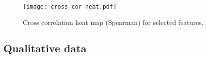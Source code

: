 \documentclass{sig-alternate}
\begin{document}
%
% 
%
%    
%
%
%



\begin{figure}
  \begin{center}
    \texttt{[image: cross-cor-heat.pdf]}
  \end{center}
  \caption{Cross correlation heat map (Spearman) for selected features.}
  \label{fig:crosscor}
\end{figure}

\subsection{Qualitative data}
\end{document}

